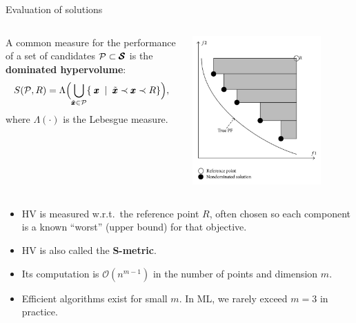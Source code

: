 \documentclass[11pt,compress,t,notes=noshow,xcolor=table]{beamer}
\begin{document}
\begin{vbframe}{Evaluation of solutions}

\begin{columns}
\begin{column}{0.5\textwidth}
A common measure for the performance of a set of candidates 
\(\mathcal{P}\subset\pmb{\mathcal{S}}\) is the \textbf{dominated hypervolume}:
\[
S(\mathcal{P},R) 
  = \Lambda\Bigl(
      \bigcup_{\tilde{\pmb{x}}\in \mathcal{P}} 
         \{\;\pmb{x} \;\mid\; 
              \tilde{\pmb{x}}\prec \pmb{x} \prec R
         \}
    \Bigr),
\]
where \(\Lambda(\cdot)\) is the Lebesgue measure.
\end{column}
\begin{column}{0.5\textwidth}
\begin{center}
\includegraphics[width=0.8\textwidth]{slides/11-multicrit/figure_man/dominated_hypervolume.png}
\end{center}
\end{column}
\end{columns}

\framebreak

\begin{itemize}
\item HV is measured w.r.t.\ the reference point \(R\), often chosen so each 
      component is a known “worst” (upper bound) for that objective.
\item HV is also called the \textbf{S-metric}.
\item Its computation is \(\mathcal{O}(n^{m-1})\) in the number of points 
      and dimension \(m\).
\item Efficient algorithms exist for small \(m\). 
      In ML, we rarely exceed \(m=3\) in practice.
\end{itemize}

\end{vbframe}

\endlecture
\end{document}
